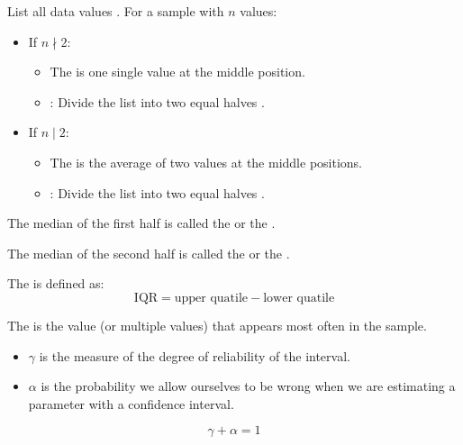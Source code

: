 \begin{multicols}{2}
      \par List all data values . For a sample with $n$ values:
      \begin{itemize}
        \item If $n \nmid 2$:
          \begin{itemize}
            \item The  is one single value at the middle position.
            \item {}: Divide the list into two equal halves .
          \end{itemize}
        \item If $n \mid 2$:
          \begin{itemize}
            \item The  is the average of two values at the middle positions.
            \item {}: Divide the list into two equal halves .
          \end{itemize}
      \end{itemize}
      \par The median of the first half is called the  or the . 
      \par The median of the second half is called the  or the .
      \par The  is defined as:
        \[
          \text{IQR} = \text{upper quatile} - \text{lower quatile}
        \]
      \par The  is the value (or multiple values) that appears most often in the sample.

      \begin{itemize}
        \item {} $\gamma$ is the measure of the degree of reliability of the interval.
        \item {} $\alpha$ is the probability we allow ourselves to be wrong when we are estimating a parameter with a confidence interval.
      \end{itemize}
      \[
        \gamma + \alpha = 1
      \]

\end{multicols}
\clearpage
